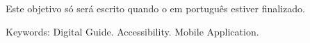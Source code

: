     \begin{Abstract}
    
    Este objetivo só será escrito quando o em português estiver finalizado.
    
    Keywords: Digital Guide. Accessibility. Mobile Application.

    \end{Abstract}